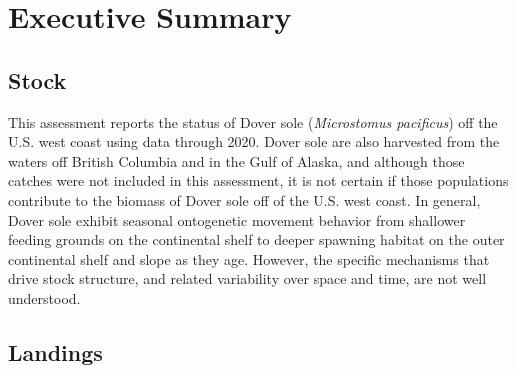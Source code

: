 \documentclass[11pt,
  english,
  a4paper,
]{article}
\begin{document}
\newpage


\hypertarget{executive-summary}{%
\section*{Executive Summary}\label{executive-summary}}

\leavevmode\tagmcend\tagstructend


\hypertarget{stock}{%
\subsection*{Stock}\label{stock}}

\leavevmode\tagmcend\tagstructend


This assessment reports the status of Dover sole (\emph{Microstomus pacificus}) off the U.S. west coast using data through 2020. Dover sole are also harvested from the waters off British Columbia and in the Gulf of Alaska, and although those catches were not included in this assessment, it is not certain if those populations contribute to the biomass of Dover sole off of the U.S. west coast. In general, Dover sole exhibit seasonal ontogenetic movement behavior from shallower feeding grounds on the continental shelf to deeper spawning habitat on the outer continental shelf and slope as they age. However, the specific mechanisms that drive stock structure, and related variability over space and time, are not well understood.

\leavevmode\tagmcend\tagstructend\par


\hypertarget{landings}{%
\subsection*{Landings}\label{landings}}

\leavevmode\tagmcend\tagstructend

\end{document}
